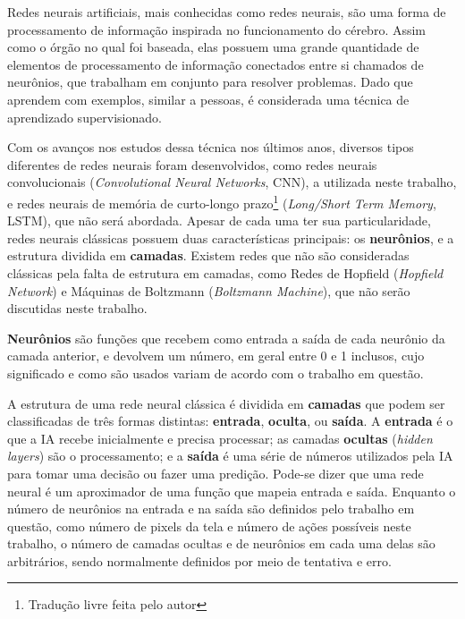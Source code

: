 
Redes neurais artificiais, mais conhecidas como redes neurais, são uma forma de processamento de informação inspirada no funcionamento do cérebro.
Assim como o órgão no qual foi baseada, elas possuem uma grande quantidade de elementos de processamento de informação conectados entre si chamados de neurônios, que trabalham em conjunto para resolver problemas.
Dado que aprendem com exemplos, similar a pessoas, é considerada uma técnica de aprendizado supervisionado.

Com os avanços nos estudos dessa técnica nos últimos anos, diversos tipos diferentes de redes neurais foram desenvolvidos, como redes neurais convolucionais (\textit{Convolutional Neural Networks}, CNN), a utilizada neste trabalho, e redes neurais de memória de curto-longo prazo\footnote{Tradução livre feita pelo autor} (\textit{Long/Short Term Memory}, LSTM), que não será abordada.
Apesar de cada uma ter sua particularidade, redes neurais clássicas possuem duas características principais: os \textbf{neurônios}, e a estrutura dividida em \textbf{camadas}.
Existem redes que não são consideradas clássicas pela falta de estrutura em camadas, como Redes de Hopfield (\textit{Hopfield Network}) e Máquinas de Boltzmann (\textit{Boltzmann Machine}), que não serão discutidas neste trabalho.

\textbf{Neurônios} são funções que recebem como entrada a saída de cada neurônio da camada anterior, e devolvem um número, em geral entre 0 e 1 inclusos, cujo significado e como são usados variam de acordo com o trabalho em questão.

A estrutura de uma rede neural clássica é dividida em \textbf{camadas} que podem ser classificadas de três formas distintas: \textbf{entrada}, \textbf{oculta}, ou \textbf{saída}.
A \textbf{entrada} é o que a IA recebe inicialmente e precisa processar; as camadas \textbf{ocultas} (\textit{hidden layers}) são o processamento; e a \textbf{saída} é uma série de números utilizados pela IA para tomar uma decisão ou fazer uma predição.
Pode-se dizer que uma rede neural é um aproximador de uma função que mapeia entrada e saída.
Enquanto o número de neurônios na entrada e na saída são definidos pelo trabalho em questão, como número de pixels da tela e número de ações possíveis neste trabalho, o número de camadas ocultas e de neurônios em cada uma delas são arbitrários, sendo normalmente definidos por meio de tentativa e erro.

